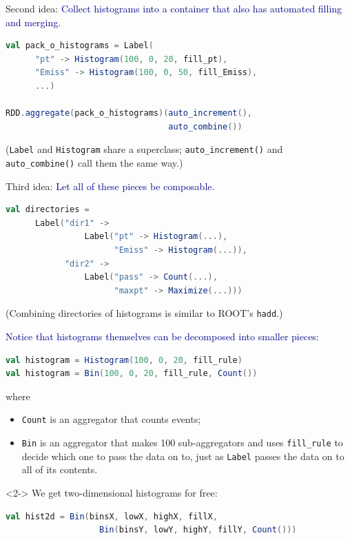 \documentclass{beamer}
\begin{document}
\begin{frame}[fragile]{Second idea:}
\textcolor{darkblue}{\large Collect histograms into a container that also has automated filling and merging.}

\begin{lstlisting}[language=scala]
val pack_o_histograms = Label(
      "pt" -> Histogram(100, 0, 20, fill_pt),
      "Emiss" -> Histogram(100, 0, 50, fill_Emiss),
      ...)

RDD.aggregate(pack_o_histograms)(auto_increment(),
                                 auto_combine())
\end{lstlisting}

\vfill
({\tt \small Label} and {\tt \small Histogram} share a superclass; {\tt \small auto\_increment()} and {\tt \small auto\_combine()} call them the same way.)
\end{frame}

\begin{frame}[fragile]{Third idea:}
\textcolor{darkblue}{\large Let all of these pieces be composable.}

\begin{lstlisting}[language=scala]
val directories =
      Label("dir1" ->
                Label("pt" -> Histogram(...),
                      "Emiss" -> Histogram(...)),
            "dir2" ->
                Label("pass" -> Count(...),
                      "maxpt" -> Maximize(...)))
\end{lstlisting}

\vspace{0.5 cm}
(Combining directories of histograms is similar to ROOT's {\tt \small hadd}.)
\end{frame}

\begin{frame}[fragile]{}
\textcolor{darkblue}{\large Notice that histograms themselves can be decomposed into smaller pieces:}

\begin{lstlisting}[language=scala]
val histogram = Histogram(100, 0, 20, fill_rule)
val histogram = Bin(100, 0, 20, fill_rule, Count())
\end{lstlisting}

where
\begin{itemize}
\item {\tt \small Count} is an aggregator that counts events;
\item {\tt \small Bin} is an aggregator that makes 100 sub-aggregators and uses {\tt \small fill\_rule} to decide which one to pass the data on to, just as {\tt \small Label} passes the data on to all of its contents.
\end{itemize}

\vspace{0.5 cm}
\begin{uncoverenv}<2->
We get two-dimensional histograms for free:
\begin{lstlisting}[language=scala]
val hist2d = Bin(binsX, lowX, highX, fillX,
                   Bin(binsY, lowY, highY, fillY, Count()))
\end{lstlisting}
\end{uncoverenv}
\vspace{-1.5 cm}
\end{frame}
\end{document}
